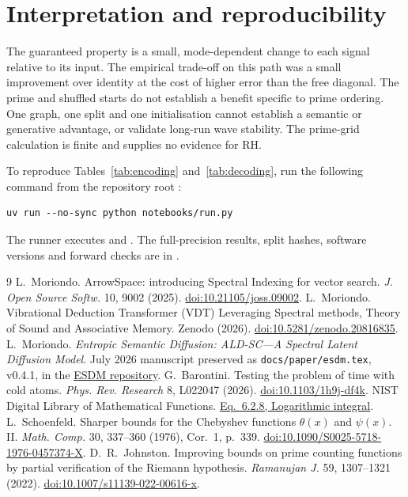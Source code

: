 \documentclass[11pt,a4paper]{article}
\begin{document}
\section{Interpretation and reproducibility}
The guaranteed property is a small, mode-dependent change to each signal
relative to its input. The empirical trade-off on this path was a small
improvement over identity at the cost of higher error than the free diagonal.
The prime and shuffled starts do not establish a benefit specific to prime
ordering. One graph, one split and one initialisation cannot establish a
semantic or generative advantage, or validate long-run wave stability. The
prime-grid calculation is finite and supplies no evidence for RH.

To reproduce Tables~\ref{tab:encoding} and~\ref{tab:decoding}, run the
following command from the repository root \cite{archive}:
\begin{verbatim}
uv run --no-sync python notebooks/run.py
\end{verbatim}
\noindent The runner executes  and
. The full-precision results, split hashes,
software versions and forward checks are in
.

\clearpage
\begin{thebibliography}{9}
L.~Moriondo. ArrowSpace: introducing Spectral Indexing for vector search.
\emph{J. Open Source Softw.} 10, 9002 (2025).
\href{https://doi.org/10.21105/joss.09002}{doi:10.21105/joss.09002}.
L.~Moriondo. Vibrational Deduction Transformer (VDT) Leveraging Spectral
methods, Theory of Sound and Associative Memory. Zenodo (2026).
\href{https://doi.org/10.5281/zenodo.20816835}{doi:10.5281/zenodo.20816835}.
L.~Moriondo. \emph{Entropic Semantic Diffusion: ALD-SC---A Spectral Latent
Diffusion Model}. July 2026 manuscript preserved as
\texttt{docs/paper/esdm.tex}, v0.4.1, in the
\href{https://github.com/tuned-org-uk/entropic-semantic-diffusion}{ESDM repository}.
G.~Barontini. Testing the problem of time with cold atoms.
\emph{Phys. Rev. Research} 8, L022047 (2026).
\href{https://doi.org/10.1103/1h9j-df4k}{doi:10.1103/1h9j-df4k}.
NIST Digital Library of Mathematical Functions.
\href{https://dlmf.nist.gov/6.2.E8}{Eq.~6.2.8, Logarithmic integral}.
L.~Schoenfeld. Sharper bounds for the Chebyshev functions $\theta(x)$ and
$\psi(x)$. II. \emph{Math. Comp.} 30, 337--360 (1976), Cor.~1, p.~339.
\href{https://doi.org/10.1090/S0025-5718-1976-0457374-X}{doi:10.1090/S0025-5718-1976-0457374-X}.
D.~R.~Johnston. Improving bounds on prime counting functions by partial
verification of the Riemann hypothesis. \emph{Ramanujan J.} 59, 1307--1321
(2022). \href{https://doi.org/10.1007/s11139-022-00616-x}{doi:10.1007/s11139-022-00616-x}.
\end{thebibliography}
\end{document}
